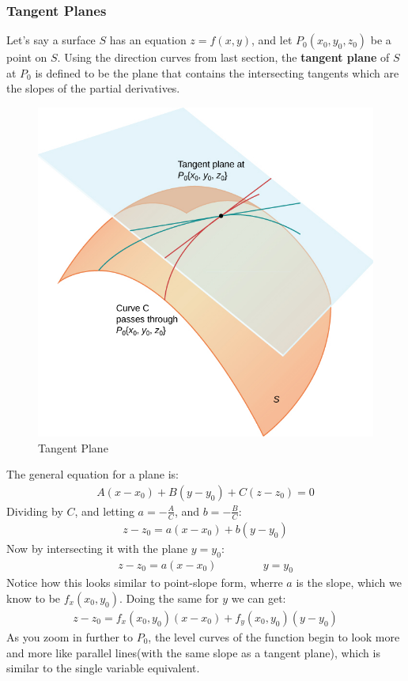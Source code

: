 \documentclass{article}
\begin{document}
\subsubsection{Tangent Planes}
Let's say a surface $S$ has an equation $z = f(x,y)$, and let $P_0(x_0,y_0,z_0)$ be a point on $S$. Using the direction curves from last section, the \textbf{tangent plane} of $S$ at $P_0$ is defined to be the plane that contains the intersecting tangents which are the slopes of the partial derivatives.
\begin{figure}[H]
\begin{center}
\includegraphics[scale=0.7]{TangentPlanes.jpeg}
\caption{Tangent Plane}
\label{tanplanes}
\end{center}
\end{figure}
The general equation for a plane is:
\begin{gather*}
    A(x-x_0) + B(y-y_0) + C(z-z_0) = 0
\end{gather*}
Dividing by $C$, and letting $a = -\frac{A}{C}$, and $b = -\frac{B}{C}$:
\begin{gather*}
    z - z_0 = a(x-x_0) + b(y-y_0)
\end{gather*}
Now by intersecting it with the plane $y = y_0$:
\begin{gather*}
    z - z_0 = a(x-x_0) \hspace{50pt} y = y_0
\end{gather*}
Notice how this looks similar to point-slope form, wherre $a$ is the slope, which we know to be $f_x(x_0,y_0)$. Doing the same for $y$ we can get:
\begin{gather*}
    z - z_0 = f_x(x_0,y_0) (x-x_0) + f_y(x_0,y_0) (y-y_0)
\end{gather*}
As you zoom in further to $P_0$, the level curves of the function begin to look more and more like parallel lines(with the same slope as a tangent plane), which is similar to the single variable equivalent.
\end{document}
